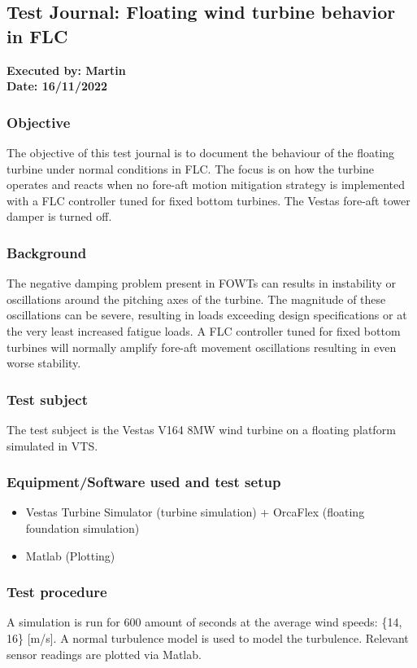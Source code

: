 \subsection{Test Journal: Floating wind turbine behavior in FLC} \label{app:tj_02}

\textbf{Executed by: Martin} \\
\textbf{Date: 16/11/2022}

\subsubsection{Objective}
The objective of this test journal is to document the behaviour of the floating turbine under normal conditions in FLC. The focus is on how the turbine operates and reacts when no fore-aft motion mitigation strategy is implemented with a FLC controller tuned for fixed bottom turbines. The Vestas fore-aft tower damper is turned off.

\subsubsection{Background}
The negative damping problem present in FOWTs can results in instability or oscillations around the pitching axes of the turbine. The magnitude of these oscillations can be severe, resulting in loads exceeding design specifications or at the very least increased fatigue loads. A FLC controller tuned for fixed bottom turbines will normally amplify fore-aft movement oscillations resulting in even worse stability.

\subsubsection{Test subject}
The test subject is the Vestas V164 8MW wind turbine on a floating platform simulated in VTS.

\subsubsection{Equipment/Software used and test setup}
\begin{itemize}
	\item Vestas Turbine Simulator (turbine simulation) + OrcaFlex (floating foundation simulation)
	\item Matlab (Plotting)
\end{itemize}

\subsubsection{Test procedure}
A simulation is run for 600 amount of seconds at the average wind speeds: \{14, 16\} [m/s]. A normal turbulence model is used to model the turbulence. Relevant sensor readings are plotted via Matlab.

